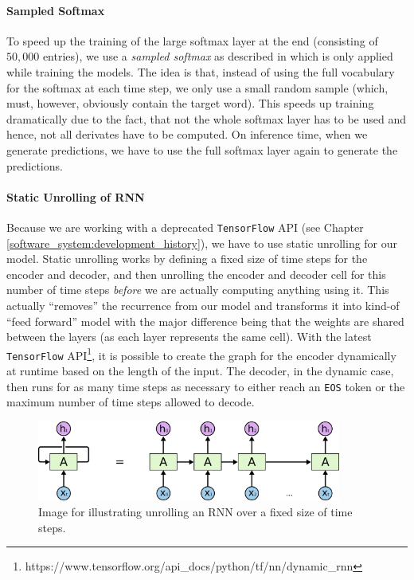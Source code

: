 \paragraph{Sampled Softmax} To speed up the training of the large softmax layer at the end (consisting of $50,000$ entries), we use a \emph{sampled softmax} as described in \cite{Sebastien:2014} which is only applied while training the models. The idea is that, instead of using the full vocabulary for the softmax at each time step, we only use a small random sample (which, must, however, obviously contain the target word). This speeds up training dramatically due to the fact, that not the whole softmax layer has to be used and hence, not all derivates have to be computed. On inference time, when we generate predictions, we have to use the full softmax layer again to generate the predictions.

\paragraph{Static Unrolling of RNN} Because we are working with a deprecated \texttt{TensorFlow} API (see Chapter \ref{software_system:development_history}), we have to use static unrolling for our model. Static unrolling works by defining a fixed size of time steps for the encoder and decoder, and then unrolling the encoder and decoder cell for this number of time steps \emph{before} we are actually computing anything using it. This actually ``removes'' the recurrence from our model and transforms it into kind-of ``feed forward'' model with the major difference being that the weights are shared between the layers (as each layer represents the same cell). With the latest \texttt{TensorFlow} API\footnote{https://www.tensorflow.org/api\_docs/python/tf/nn/dynamic\_rnn}, it is possible to create the graph for the encoder dynamically at runtime based on the length of the input. The decoder, in the dynamic case, then runs for as many time steps as necessary to either reach an \texttt{EOS} token or the maximum number of time steps allowed to decode.

\begin{figure}
	\label{methods:static_unrolling:unrolled_rnn}
	\centering
	\includegraphics[width=10cm]{img/rnn_unrolled}
	\caption{Image for illustrating unrolling an RNN over a fixed size of time steps.\protect\footnotemark}
\end{figure}

